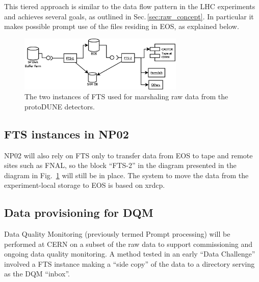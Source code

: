 \documentclass[12pt]{article}
\begin{document}
This tiered approach is similar to the data flow pattern in the LHC experiments and achieves several goals,
as outlined in Sec.\,\ref{sec:raw_concept}. In particular
it makes possible prompt use of the files residing in EOS, as explained below.

\begin{figure}[tbh]
  \centering
  \includegraphics[width=0.7\textwidth]{figures/ftsinstances_v2.png}
  \caption{The two instances of FTS used for marshaling raw data from the protoDUNE detectors.}
  \label{fig:ftsinstances}
\end{figure}

\subsection{FTS instances in NP02}
NP02 will also rely on FTS only to transfer data from EOS to tape and remote sites such as FNAL,
so the block ``FTS-2'' in the diagram presented in the diagram in Fig.~\ref{fig:ftsinstances} will still be in place.
The system to move the data from the experiment-local storage to EOS is based on xrdcp.

\subsection{Data provisioning for DQM}
\label{sec:prompt}

Data Quality Monitoring (previously termed Prompt processing) will be performed at CERN on a subset of the raw
data to support commissioning and ongoing data quality monitoring.
A method tested in an early ``Data Challenge'' involved a FTS instance
making a ``side copy'' of the data to a directory serving as the DQM ``inbox''.


\end{document}
